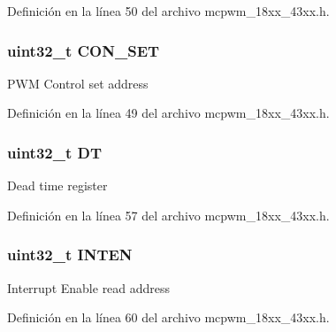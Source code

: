 Definición en la línea 50 del archivo mcpwm\+\_\+18xx\+\_\+43xx.\+h.

\subsubsection[{\texorpdfstring{C\+O\+N\+\_\+\+S\+ET}{CON_SET}}]{ uint32\+\_\+t C\+O\+N\+\_\+\+S\+ET}\hypertarget{struct_l_p_c___m_c_p_w_m___t_a3058aa6ddb76ec0be552cc55e06c72b0}{}\label{struct_l_p_c___m_c_p_w_m___t_a3058aa6ddb76ec0be552cc55e06c72b0}
P\+WM Control set address 

Definición en la línea 49 del archivo mcpwm\+\_\+18xx\+\_\+43xx.\+h.

\subsubsection[{\texorpdfstring{DT}{DT}}]{ uint32\+\_\+t DT}\hypertarget{struct_l_p_c___m_c_p_w_m___t_af7f329e520f47f433f4d2621e968b2ae}{}\label{struct_l_p_c___m_c_p_w_m___t_af7f329e520f47f433f4d2621e968b2ae}
Dead time register 

Definición en la línea 57 del archivo mcpwm\+\_\+18xx\+\_\+43xx.\+h.

\subsubsection[{\texorpdfstring{I\+N\+T\+EN}{INTEN}}]{ uint32\+\_\+t I\+N\+T\+EN}\hypertarget{struct_l_p_c___m_c_p_w_m___t_a0d56d547a72165926c5db3ea2ae78ff5}{}\label{struct_l_p_c___m_c_p_w_m___t_a0d56d547a72165926c5db3ea2ae78ff5}
Interrupt Enable read address 

Definición en la línea 60 del archivo mcpwm\+\_\+18xx\+\_\+43xx.\+h.

